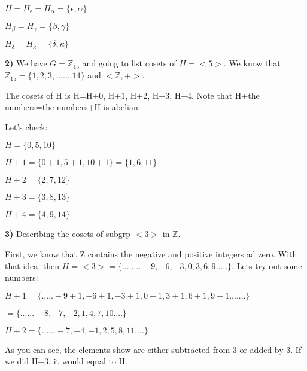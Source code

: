 \documentclass{article}
\begin{document}
\medskip

$H=H_{\epsilon}=H_{\alpha}=\{\epsilon, \alpha\}$

\medskip

$H_{\beta}=H_{\gamma}=\{\beta, \gamma\}$

\medskip

$H_{\delta}=H_{\kappa}=\{\delta, \kappa\}$

\newpage

\textbf{2)} We have $G=\mathbb{Z}_{15}$ and going to list cosets of $H=<5>$. We know that $\mathbb{Z}_{15}=\{1, 2, 3,.......14\}$ and $<\mathbb{Z} ,+>$.

\medskip

The cosets of H is H=H+0, H+1, H+2, H+3, H+4. Note that H+the numbers=the numbers+H is abelian. 

\medskip

Let's check:

\medskip

$H=\{0, 5, 10\}$

\medskip

$H+1=\{0+1, 5+1, 10+1\}=\{1, 6, 11\}$

\medskip

$H+2=\{2, 7, 12\}$

\medskip

$H+3=\{3, 8, 13\}$

\medskip

$H+4=\{4, 9, 14\}$




\newpage

\textbf{3)} Describing the cosets of subgrp $<3>$ in $\mathbb{Z}$. 

\medskip

First, we know that Z contains the negative and positive integers ad zero. With that idea, then $H=<3>=\{........-9,-6,-3,0,3,6,9.....\}$.
Lets try out some numbers:

\medskip

$H+1=\{.....-9+1, -6+1, -3+1, 0+1, 3+1, 6+1, 9+1.......\}$

\hspace{.4in}$=\{......-8, -7, -2, 1, 4, 7, 10....\}$

\medskip

$H+2=\{......-7, -4, -1, 2,  5, 8, 11....\}$

\medskip

As you can see, the elements show are either subtracted from 3 or added by 3.  If we did H+3, it would equal to H.
\end{document}
